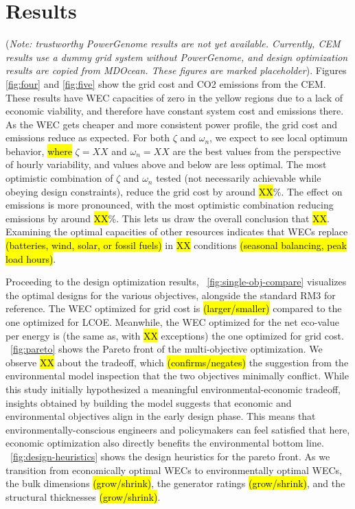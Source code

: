 \documentclass[10pt,twoside]{article}
\begin{document}
\section{Results}
(\textit{Note: trustworthy PowerGenome results are not yet available. Currently, CEM results use a dummy grid system without PowerGenome, and design optimization results are copied from MDOcean. These figures are marked placeholder}).
Figures \ref{fig:four} and \ref{fig:five} show the grid cost and CO2 emissions from the CEM.
These results have WEC capacities of zero in the yellow regions due to a lack of economic viability, and therefore have constant system cost and emissions there.
As the WEC gets cheaper and more consistent power profile, the grid cost and emissions reduce as expected.
For both $\zeta$ and $\omega_n$, we expect to see local optimum behavior, \hl{where} $\zeta=XX$ and $\omega_n=XX$ are the best values from the perspective of hourly variability, and values above and below are less optimal.
The most optimistic combination of $\zeta$ and $\omega_n$ tested (not necessarily achievable while obeying design constraints), reduce the grid cost by around \hl{XX}\%.
The effect on emissions is more pronounced, with the most optimistic combination reducing emissions by around \hl{XX}\%.
This lets us draw the overall conclusion that \hl{XX}.
Examining the optimal capacities of other resources indicates that WECs replace \hl{(batteries, wind, solar, or fossil fuels)} in \hl{XX} conditions \hl{(seasonal balancing, peak load hours)}.

Proceeding to the design optimization results, \figureautorefname~\ref{fig:single-obj-compare} visualizes the optimal designs for the various objectives, alongside the standard RM3 for reference.
The WEC optimized for grid cost is \hl{(larger/smaller)} compared to the one optimized for LCOE.
Meanwhile, the WEC optimized for the net eco-value per energy is (the same as, with \hl{XX} exceptions) the one optimized for grid cost.
\figureautorefname~\ref{fig:pareto} shows the Pareto front of the multi-objective optimization.
We observe \hl{XX} about the tradeoff, which \hl{(confirms/negates)} the suggestion from the environmental model inspection that the two objectives minimally conflict.
While this study initially hypothesized a meaningful environmental-economic tradeoff, insights obtained by building the model suggests that economic and environmental objectives align in the early design phase.
This means that environmentally-conscious engineers and policymakers can feel satisfied that here, economic optimization also directly benefits the environmental bottom line.
\figureautorefname~\ref{fig:design-heuristics} shows the design heuristics for the pareto front.
As we transition from economically optimal WECs to environmentally optimal WECs, the bulk dimensions \hl{(grow/shrink)}, the generator ratings \hl{(grow/shrink)}, and the structural thicknesses \hl{(grow/shrink)}.
\end{document}
